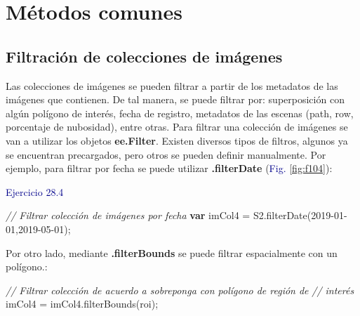 \documentclass[
  12pt,
  letterpaper,
  twoside]{book}
\newenvironment{Shaded}{\begin{snugshade}}{\end{snugshade}}
\newcommand{\CommentTok}[1]{\textcolor[rgb]{0.24,0.58,0.00}{\textit{#1}}}
\newcommand{\ControlFlowTok}[1]{\textcolor[rgb]{0.00,0.00,0.00}{\textbf{#1}}}
\newcommand{\FunctionTok}[1]{\textcolor[rgb]{0.48,0.12,0.64}{#1}}
\newcommand{\NormalTok}[1]{#1}
\newcommand{\OperatorTok}[1]{\textcolor[rgb]{0.00,0.00,0.00}{#1}}
\newcommand{\StringTok}[1]{\textcolor[rgb]{0.87,0.29,0.22}{#1}}
\newcommand\boldpurple[1]{\textcolor{darkpurple}{\textbf{#1}}}
\begin{document}
\hypertarget{muxe9todos-comunes-4}{%
\section{Métodos comunes}\label{muxe9todos-comunes-4}}

\hypertarget{filtraciuxf3n-de-colecciones-de-imuxe1genes}{%
\subsection*{Filtración de colecciones de imágenes}\label{filtraciuxf3n-de-colecciones-de-imuxe1genes}}

Las colecciones de imágenes se pueden filtrar a partir de los metadatos de las imágenes que contienen. De tal manera, se puede filtrar por: superposición con algún polígono de interés, fecha de registro, metadatos de las escenas (path, row, porcentaje de nubosidad), entre otras. Para filtrar una colección de imágenes se van a utilizar los objetos \boldpurple{ee.Filter}. Existen diversos tipos de filtros, algunos ya se encuentran precargados, pero otros se pueden definir manualmente. Por ejemplo, para filtrar por fecha se puede utilizar \boldpurple{.filterDate} (\textcolor{darkblue}{Fig.} \ref{fig:f104}):

\newpage

\textcolor{darkblue}{Ejercicio 28.4}

\begin{Shaded}
\begin{Highlighting}[]
\CommentTok{// Filtrar colección de imágenes por fecha}
\ControlFlowTok{var}\NormalTok{ imCol4 }\OperatorTok{=}\NormalTok{ S2}\OperatorTok{.}\FunctionTok{filterDate}\NormalTok{(}\StringTok{\textquotesingle{}2019{-}01{-}01\textquotesingle{}}\OperatorTok{,}\StringTok{\textquotesingle{}2019{-}05{-}01\textquotesingle{}}\NormalTok{)}\OperatorTok{;}
\end{Highlighting}
\end{Shaded}

Por otro lado, mediante \boldpurple{.filterBounds} se puede filtrar espacialmente con un polígono.:

\begin{Shaded}
\begin{Highlighting}[]
\CommentTok{// Filtrar colección de acuerdo a sobreponga con polígono de región de }
\CommentTok{// interés}
\NormalTok{imCol4 }\OperatorTok{=}\NormalTok{ imCol4}\OperatorTok{.}\FunctionTok{filterBounds}\NormalTok{(roi)}\OperatorTok{;}
\end{Highlighting}
\end{Shaded}
\end{document}
